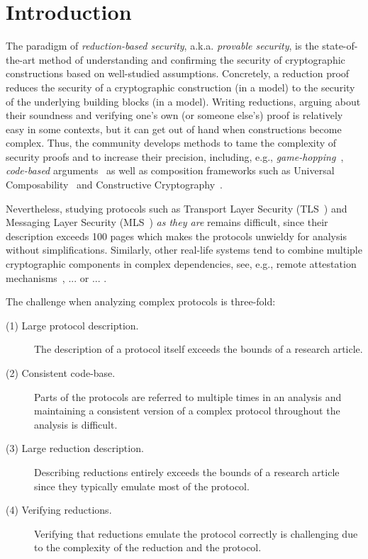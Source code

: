 \section{Introduction}
The paradigm of \emph{reduction-based security}, a.k.a. \emph{provable security}, is the state-of-the-art method of understanding and confirming the security of cryptographic constructions based on well-studied assumptions. Concretely, a reduction proof reduces the security of a cryptographic construction (in a model) to the security of the underlying building blocks (in a model). Writing reductions, arguing about their soundness and verifying one's own (or someone else's) proof is relatively easy in some contexts, but it can get out of hand when constructions become complex. Thus, the community develops methods to tame the complexity of security proofs and to increase their precision, including, e.g., \emph{game-hopping}~\cite{EPRINT:Shoup04}, \emph{code-based} arguments~\cite{EC:BelRog06} as well as composition frameworks such as Universal Composability~\cite{FOCS:Canetti01} and Constructive Cryptography~\cite{FC:Maurer10}.

Nevertheless, studying protocols such as Transport Layer Security (TLS~\cite{TLS13})
and Messaging Layer Security (MLS~\cite{MLS}) \emph{as they are} 
remains difficult, since their description exceeds 100 pages which makes the protocols unwieldy for analysis without simplifications. Similarly, other real-life systems tend to combine multiple cryptographic components in complex dependencies,
see, e.g., remote attestation mechanisms~\cite{https://arxiv.org/pdf/2102.08804.pdf,https://en.wikipedia.org/wiki/Trusted_Computing}, ... or ... .

The challenge when analyzing complex protocols is three-fold:
\begin{description}
\item[(1) Large protocol description.] The description of a protocol itself exceeds the bounds of a research article.
\item[(2) Consistent code-base.] Parts of the protocols are referred to multiple times in an analysis and maintaining a consistent version of a complex protocol throughout the analysis is difficult.
\item[(3) Large reduction description.] Describing reductions entirely exceeds the bounds of a research article since they typically emulate most of the protocol.
\item[(4) Verifying reductions.] Verifying that reductions emulate the protocol correctly is challenging due to the complexity of the reduction and the protocol.
\end{description}

